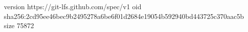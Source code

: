 version https://git-lfs.github.com/spec/v1
oid sha256:2cd95ee46bec9b2495278a6be6f01d2684e19054b592940bd443725c370aac5b
size 75872
